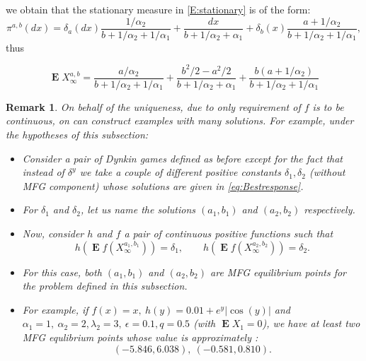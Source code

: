 \documentclass{article}
\newtheorem{remark}[thm]{Remark}
\newcommand\E{\operatorname{\mathbf{E}}}
\begin{document}
we obtain that the stationary measure in \eqref{E:stationary} is of the form:
$$ \pi^{a,b}(dx)=\delta_a(dx) \frac{\displaystyle 1/\alpha_2}{b+1/\alpha_2+1/\alpha_1}+\frac{\displaystyle dx}{b+1/\alpha_2+\alpha_1} + \delta_b (x) \frac{\displaystyle a+1/\alpha_2}{b+1/\alpha_2+1/\alpha_1},$$
thus

$$\E X_{\infty}^{a,b} = \frac{\displaystyle a/\alpha_2}{b+1/\alpha_2+1/\alpha_1}+\frac{\displaystyle b^2/2 -a^2/2}{b+1/\alpha_2+\alpha_1} +  \frac{\displaystyle b(a+1/\alpha_2)}{b+1/\alpha_2+1/\alpha_1} $$

\begin{remark}\label{Remark:Nonuniqueness}
    On behalf of the uniqueness, due to only requirement of $f$ is to be continuous, on can construct examples with many solutions. For example, under the hypotheses of this subsection:
    \begin{itemize}
        \item[\rm{i)}] Consider a pair of Dynkin games defined as before except for the fact that instead of $\delta^y$ we take a couple of different positive constants $\delta_1,\delta_2$  (without MFG component) whose solutions are given in \eqref{eq:Bestresponse}.
        \item[\rm{ii)}] For $\delta_1$ and $\delta_2$, let us name the solutions $(a_1,b_1)$ and $(a_2,b_2)$ respectively.
        \item[\rm{iii)}]
        Now, consider $h$ and $f$ a pair of continuous positive functions such that 
        $$h \left( \E f(X^{a_1,b_1}_{\infty})   \right) =\delta_1, \qquad h \left( \E f(X^{a_2,b_2}_{\infty})   \right) =\delta_2 . $$
        \item[\rm{iv)}] For this case, both $(a_1,b_1)$ and $(a_2,b_2)$ are MFG equilibrium points for the problem defined in this subsection.
        \item[\rm{v)}] For example, if $f(x)=x,  \ h(y)=0.01 + e^y \vert \cos(y) \vert$ and $\alpha_1=1, \ \alpha_2=2, \lambda_2=3, \ \epsilon=0.1, q=0.5$ (with $\E X_1=0 $), we have at least two MFG equlibrium points whose value is approximately :
        $$( -5.846 , 6.038), \ (-0.581 , 0.810) .$$
    \end{itemize}
\end{remark}

%



%
\end{document}
